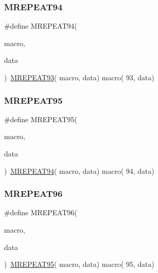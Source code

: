\mbox{\label{group__group__sam0__utils__mrepeat_ga44f7fcb2a7286d5d105c9d25f400aec2}} 
\subsubsection{\texorpdfstring{MREPEAT94}{MREPEAT94}}
{\footnotesize\ttfamily \#define M\+R\+E\+P\+E\+A\+T94(\begin{DoxyParamCaption}\item[{}]{macro,  }\item[{}]{data }\end{DoxyParamCaption})~\mbox{\hyperlink{group__group__sam0__utils__mrepeat_gaa8143ea25cb446fb9e5afa4f79a7fbd8}{M\+R\+E\+P\+E\+A\+T93}}( macro, data)   macro( 93, data)}

\mbox{\label{group__group__sam0__utils__mrepeat_ga40aa5234382c6c5f3f60df82c0dbaa40}} 
\subsubsection{\texorpdfstring{MREPEAT95}{MREPEAT95}}
{\footnotesize\ttfamily \#define M\+R\+E\+P\+E\+A\+T95(\begin{DoxyParamCaption}\item[{}]{macro,  }\item[{}]{data }\end{DoxyParamCaption})~\mbox{\hyperlink{group__group__sam0__utils__mrepeat_ga44f7fcb2a7286d5d105c9d25f400aec2}{M\+R\+E\+P\+E\+A\+T94}}( macro, data)   macro( 94, data)}

\mbox{\label{group__group__sam0__utils__mrepeat_ga0b773eb3863eaca9403e8db99a4073e6}} 
\subsubsection{\texorpdfstring{MREPEAT96}{MREPEAT96}}
{\footnotesize\ttfamily \#define M\+R\+E\+P\+E\+A\+T96(\begin{DoxyParamCaption}\item[{}]{macro,  }\item[{}]{data }\end{DoxyParamCaption})~\mbox{\hyperlink{group__group__sam0__utils__mrepeat_ga40aa5234382c6c5f3f60df82c0dbaa40}{M\+R\+E\+P\+E\+A\+T95}}( macro, data)   macro( 95, data)}

